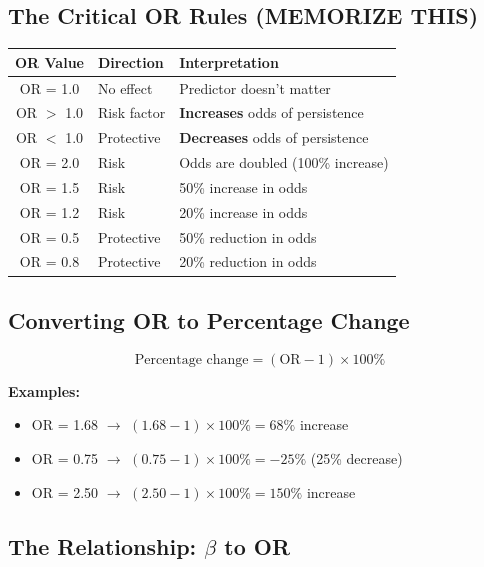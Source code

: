 \documentclass[11pt,a4paper]{article}
\begin{document}
\subsection{The Critical OR Rules (MEMORIZE THIS)}

\begin{table}[h]
\centering
\begin{tabular}{@{}clp{7cm}@{}}
\toprule
\textbf{OR Value} & \textbf{Direction} & \textbf{Interpretation} \\
\midrule
OR = 1.0 & No effect & Predictor doesn't matter \\
OR $>$ 1.0 & Risk factor & \textbf{Increases} odds of persistence \\
OR $<$ 1.0 & Protective & \textbf{Decreases} odds of persistence \\
\midrule
OR = 2.0 & Risk & Odds are doubled (100\% increase) \\
OR = 1.5 & Risk & 50\% increase in odds \\
OR = 1.2 & Risk & 20\% increase in odds \\
OR = 0.5 & Protective & 50\% reduction in odds \\
OR = 0.8 & Protective & 20\% reduction in odds \\
\bottomrule
\end{tabular}
\end{table}

\subsection{Converting OR to Percentage Change}

\begin{equation}
\boxed{\text{Percentage change} = (\text{OR} - 1) \times 100\%}
\end{equation}

\begin{example}
\textbf{Examples:}
\begin{itemize}
    \item OR = 1.68 $\rightarrow$ $(1.68 - 1) \times 100\% = 68\%$ increase
    \item OR = 0.75 $\rightarrow$ $(0.75 - 1) \times 100\% = -25\%$ (25\% decrease)
    \item OR = 2.50 $\rightarrow$ $(2.50 - 1) \times 100\% = 150\%$ increase
\end{itemize}
\end{example}

\subsection{The Relationship: $\beta$ to OR}
\end{document}
